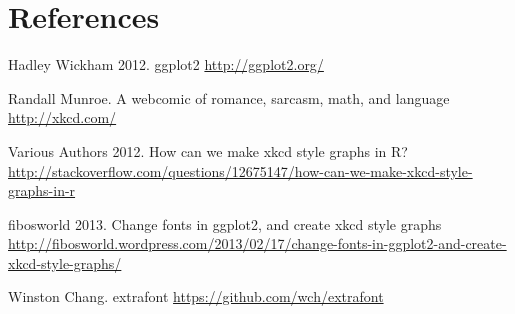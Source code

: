 \documentclass[10pt]{article}
\begin{document}
\section{References}


    Hadley Wickham 2012. ggplot2 \url{http://ggplot2.org/}
    
    Randall Munroe. A webcomic of romance, sarcasm, math, and language
    \url{http://xkcd.com/}

    Various Authors 2012. How can we make xkcd style graphs in R? \url{http://stackoverflow.com/questions/12675147/how-can-we-make-xkcd-style-graphs-in-r}

    fibosworld 2013. Change fonts in ggplot2, and create xkcd style graphs \url{http://fibosworld.wordpress.com/2013/02/17/change-fonts-in-ggplot2-and-create-xkcd-style-graphs/}

    Winston Chang. extrafont \url{https://github.com/wch/extrafont}
\end{document}

